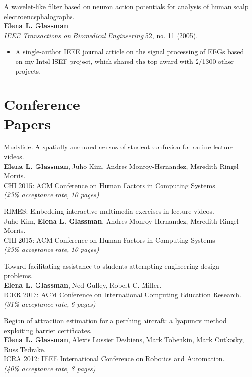 \documentclass[margin]{res}
\begin{document}
\begin{resume}
A wavelet-like filter based on neuron action potentials for analysis of human scalp electroencephalographs.\\ 
{\bf Elena L. Glassman}\\
\textit{IEEE Transactions on Biomedical Engineering} 52, no. 11 (2005).
\begin{itemize} \itemsep -2pt  %
\item A single-author IEEE journal article on the signal processing of EEGs based on my Intel ISEF project, which shared the top award with 2/1300 other projects. 
\end{itemize}

\section{Conference\\ Papers}

Mudslide: A spatially anchored census of student confusion for online lecture videos.\\
{\bf Elena L. Glassman}, Juho Kim, Andres Monroy-Hernandez, Meredith Ringel Morris.\\
CHI 2015: ACM Conference on Human Factors in Computing Systems.\\
{\it (23\% acceptance rate, 10 pages)}

RIMES: Embedding interactive multimedia exercises in lecture videos.\\
Juho Kim, {\bf Elena L. Glassman}, Andres Monroy-Hernandez, Meredith Ringel Morris. \\
CHI 2015: ACM Conference on Human Factors in Computing Systems.\\
{\it (23\% acceptance rate, 10 pages)}

Toward facilitating assistance to students attempting engineering design problems.\\
{\bf Elena L. Glassman}, Ned Gulley, Robert C. Miller. \\
ICER 2013: ACM Conference on International Computing Education Research.\\
{\it (31\% acceptance rate, 6 pages)}

Region of attraction estimation for a perching aircraft: a lyapunov method exploiting barrier certificates.\\
{\bf Elena L. Glassman}, Alexis Lussier Desbiens, Mark Tobenkin, Mark Cutkosky, Russ Tedrake.\\
ICRA 2012: IEEE International Conference on Robotics and Automation.\\
{\it (40\% acceptance rate, 8 pages)}


\end{resume}
\end{document}
